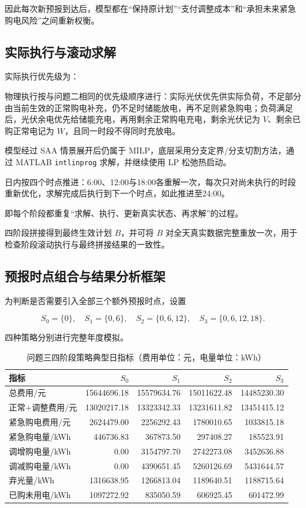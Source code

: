 因此每次新预报到达后，模型都在“保持原计划”“支付调整成本”和“承担未来紧急购电风险”之间重新权衡。

\subsection{实际执行与滚动求解}

实际执行优先级为：

物理执行按与问题二相同的优先级顺序进行：实际光伏优先供实际负荷，不足部分由当前生效的正常购电补充，仍不足时储能放电，再不足则紧急购电；负荷满足后，光伏余电优先给储能充电，再用剩余正常购电充电，剩余光伏记为 \(V\)、剩余已购正常电记为 \(W\)，且同一时段不得同时充放电。

模型经过 SAA 情景展开后仍属于 MILP，底层采用分支定界/分支切割方法，通过 MATLAB \texttt{intlinprog} 求解，并继续使用 LP 松弛热启动。

日内按四个时点推进：6:00、12:00与18:00各重解一次，每次只对尚未执行的时段重新优化，求解完成后执行到下一个时点，如此推进至24:00。

即每个阶段都重复“求解、执行、更新真实状态、再求解”的过程。

四阶段拼接得到最终生效计划 \(B\)，并可将 \(B\) 对全天真实数据完整重放一次，用于检查阶段滚动执行与最终拼接结果的一致性。

\subsection{预报时点组合与结果分析框架}

为判断是否需要引入全部三个额外预报时点，设置

\[
S_0=\{0\},
\quad
S_1=\{0,6\},
\quad
S_2=\{0,6,12\},
\quad
S_3=\{0,6,12,18\}.
\]

四种策略分别进行完整年度模拟。

\begin{table}[H]
\centering
{}
\begin{tabular}{lrrrr}
\toprule
指标 & \(S_0\) & \(S_1\) & \(S_2\) & \(S_3\) \\
\midrule
总费用/元 & 15644696.18 & 15579634.76 & 15011622.48 & 14485230.30 \\
正常+调整费用/元 & 13020217.18 & 13323342.33 & 13231611.82 & 13451415.12 \\
紧急购电费用/元 & 2624479.00 & 2256292.43 & 1780010.65 & 1033815.18 \\
紧急购电量/kWh & 446736.83 & 367873.50 & 297408.27 & 185523.91 \\
调增购电量/kWh & 0.00 & 3154797.70 & 2742273.08 & 3452636.88 \\
调减购电量/kWh & 0.00 & 4390651.45 & 5260126.69 & 5431644.57 \\
弃光量/kWh & 1316638.95 & 1266813.04 & 1189640.51 & 1188715.64 \\
已购未用电/kWh & 1097272.92 & 835050.59 & 606925.45 & 601472.99 \\
\bottomrule
\end{tabular}
\caption{问题三四阶段策略典型日指标（费用单位：元，电量单位：kWh）}
\label{tab:8}
\end{table}

